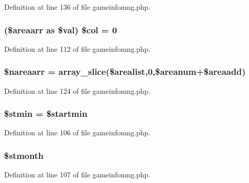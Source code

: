Definition at line 136 of file gameinfomng.\+php.

\hypertarget{gameinfomng_8php_a6c0dccc8b4507bd8513a8f436e16e39c}{
\subsubsection[{\$col}]{ (\$areaarr as \$val) \$col = 0}}\label{gameinfomng_8php_a6c0dccc8b4507bd8513a8f436e16e39c}


Definition at line 112 of file gameinfomng.\+php.

\hypertarget{gameinfomng_8php_aae0e687b9aec3ddcaa1da1750caa671e}{
\subsubsection[{\$nareaarr}]{\setlength{\rightskip}{0pt plus 5cm}\$nareaarr = array\+\_\+slice(\$arealist,0,\$areanum+\$areaadd)}}\label{gameinfomng_8php_aae0e687b9aec3ddcaa1da1750caa671e}


Definition at line 124 of file gameinfomng.\+php.

\hypertarget{gameinfomng_8php_a673bc1547456f6d21e386b6d3add1b91}{
\subsubsection[{\$stmin}]{\setlength{\rightskip}{0pt plus 5cm}\$stmin = \$startmin}}\label{gameinfomng_8php_a673bc1547456f6d21e386b6d3add1b91}


Definition at line 106 of file gameinfomng.\+php.

\hypertarget{gameinfomng_8php_a006358beabddbdb9061eb2079213a082}{
\subsubsection[{\$stmonth}]{\setlength{\rightskip}{0pt plus 5cm}\$stmonth}}\label{gameinfomng_8php_a006358beabddbdb9061eb2079213a082}


Definition at line 107 of file gameinfomng.\+php.

